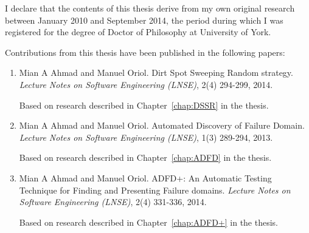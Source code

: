 \begin{declaration}

I declare that the contents of this thesis derive from my own original research between January 2010 and September 2014, the period during which I was registered for the degree of Doctor of Philosophy at University of York.

Contributions from this thesis have been published in the following papers: \\

\begin{enumerate}

\item Mian A Ahmad and Manuel Oriol. Dirt Spot Sweeping Random strategy. \textit{Lecture Notes on Software Engineering (LNSE)}, 2(4) 294-299, 2014.

Based on research described in Chapter~\ref{chap:DSSR} in the thesis.\\

\item Mian A Ahmad and Manuel Oriol. Automated Discovery of Failure Domain. \textit{Lecture Notes on Software Engineering (LNSE)}, 1(3) 289-294, 2013.

Based on research described in Chapter~\ref{chap:ADFD} in the thesis.\\

\item Mian A Ahmad and Manuel Oriol. ADFD+: An Automatic Testing Technique for Finding and Presenting Failure domains. \textit{Lecture Notes on Software Engineering (LNSE)}, 2(4) 331-336, 2014.

Based on research described in Chapter~\ref{chap:ADFD+} in the thesis.\\


\end{enumerate}

\end{declaration}